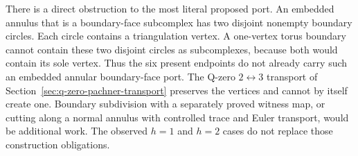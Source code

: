 There is a direct obstruction to the most literal proposed port.  An embedded
annulus that is a boundary-face subcomplex has two disjoint nonempty boundary
circles.  Each circle contains a triangulation vertex.  A one-vertex torus
boundary cannot contain these two disjoint circles as subcomplexes, because
both would contain its sole vertex.  Thus the six present endpoints do not
already carry such an embedded annular boundary-face port.  The Q-zero
$2\leftrightarrow3$ transport of Section~\ref{sec:q-zero-pachner-transport}
preserves the vertices and cannot by itself create one.  Boundary subdivision
with a separately proved witness map, or cutting along a normal annulus with
controlled trace and Euler transport, would be additional work.  The observed
$h=1$ and $h=2$ cases do not replace those construction obligations.
